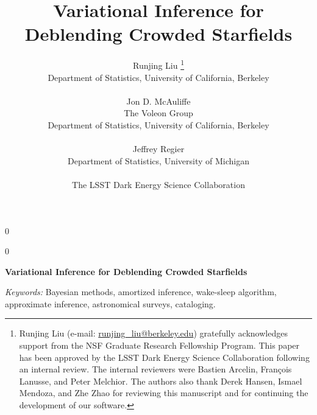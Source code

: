 \documentclass[12pt]{article}
\date{\vspace{-10px}}
\newcommand{\blind}{0}
\begin{document}
%

\def\spacingset#1{\renewcommand{\baselinestretch}%
{#1}\small\normalsize} \spacingset{1}


\blind
{
  \title{  \vspace{-30px}
\bf Variational Inference for Deblending Crowded Starfields}
  \author{Runjing Liu
  \thanks{
  Runjing Liu (e-mail: \url{runjing_liu@berkeley.edu}) gratefully acknowledges support from the NSF Graduate Research Fellowship Program.  
  This paper has been approved by the LSST Dark Energy Science Collaboration following an internal review. 
  The internal reviewers were 
  Bastien Arcelin,
  Fran\c{c}ois Lanusse, and 
  Peter Melchior. 
  The authors also thank Derek Hansen, Ismael Mendoza, and Zhe Zhao for reviewing this manuscript and for continuing the development of our software.
  }
  \hspace{.2cm}\\
    Department of Statistics, University of California, Berkeley\\
    \\
    Jon D. McAuliffe \\
    The Voleon Group \\
    Department of Statistics, University of California, Berkeley\\
    \\
    Jeffrey Regier \\
    Department of Statistics, University of Michigan\\
    \\
    The LSST Dark Energy Science Collaboration
    }
  \maketitle
} \fi

\blind
{
  \bigskip
  \bigskip
  \bigskip
  \begin{center}
    {\LARGE\bf Variational Inference for Deblending Crowded Starfields}
\end{center}
  \medskip
} \fi

\bigskip
\begin{abstract}

\end{abstract}

\noindent%
{\it Keywords:}  Bayesian methods, amortized inference, wake-sleep algorithm, approximate inference, astronomical surveys, cataloging. 
\end{document}
